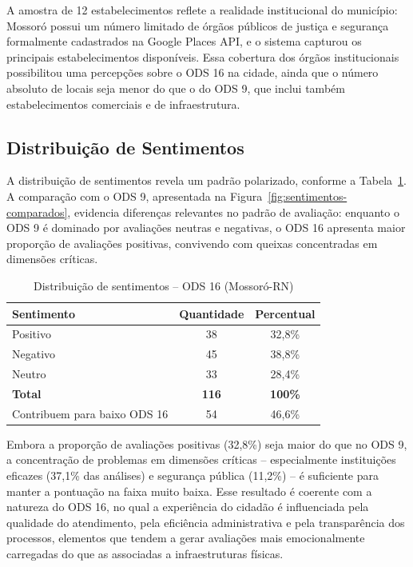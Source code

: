 A amostra de 12 estabelecimentos reflete a realidade institucional do município: Mossoró possui um número limitado de órgãos públicos de justiça e segurança formalmente cadastrados na Google Places API, e o sistema capturou os principais estabelecimentos disponíveis. Essa cobertura dos órgãos institucionais possibilitou uma percepções sobre o ODS 16 na cidade, ainda que o número absoluto de locais seja menor do que o do ODS 9, que inclui também estabelecimentos comerciais e de infraestrutura.

\subsection{Distribuição de Sentimentos}
\label{subsec:sentimentos-ods16}

A distribuição de sentimentos revela um padrão polarizado, conforme a Tabela~\ref{tab:sentimentos-ods16}. A comparação com o ODS 9, apresentada na Figura~\ref{fig:sentimentos-comparados}, evidencia diferenças relevantes no padrão de avaliação: enquanto o ODS 9 é dominado por avaliações neutras e negativas, o ODS 16 apresenta maior proporção de avaliações positivas, convivendo com queixas concentradas em dimensões críticas.

\begin{table}[h!]
    \centering
    \caption{Distribuição de sentimentos -- ODS 16 (Mossoró-RN)}
    \label{tab:sentimentos-ods16}
    \begin{tabular}{lcc}
        \hline
        \textbf{Sentimento} & \textbf{Quantidade} & \textbf{Percentual} \\
        \hline
        Positivo & 38 & 32,8\% \\
        Negativo & 45 & 38,8\% \\
        Neutro & 33 & 28,4\% \\
        \hline
        \textbf{Total} & \textbf{116} & \textbf{100\%} \\
        Contribuem para baixo ODS 16 & 54 & 46,6\% \\
        \hline
    \end{tabular}
\end{table}

Embora a proporção de avaliações positivas (32,8\%) seja maior do que no ODS 9, a concentração de problemas em dimensões críticas -- especialmente instituições eficazes (37,1\% das análises) e segurança pública (11,2\%) -- é suficiente para manter a pontuação na faixa muito baixa. Esse resultado é coerente com a natureza do ODS 16, no qual a experiência do cidadão é influenciada pela qualidade do atendimento, pela eficiência administrativa e pela transparência dos processos, elementos que tendem a gerar avaliações mais emocionalmente carregadas do que as associadas a infraestruturas físicas.

